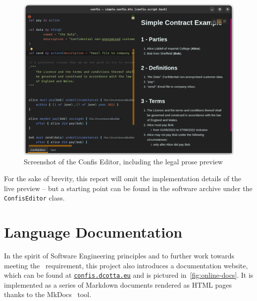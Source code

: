\begin{figure}[h]
    \centering
    \includegraphics[width=\textwidth]{figures/simple.confis.editor}
    \caption{Screenshot of the Confis Editor, including the legal prose preview}
    \label{fig:confis.minimal.editor}
\end{figure}



For the sake of brevity, this report will omit the implementation details of the live preview -- but a starting point can be found in the software archive under the \texttt{ConfisEditor} class.


\section{Language Documentation}\label{sec:language-documentation}

In the spirit of Software Engineering principles and to further work towards meeting the~ requirement, this project also introduces a documentation website, which can be found at \href{https://confis.dcotta.eu}{\texttt{confis.dcotta.eu}} and is pictured in~\autoref{fig:online-docs}.
It is implemented as a series of Markdown documents rendered as HTML pages thanks to the MkDocs~\cite{mkDocs} tool.

